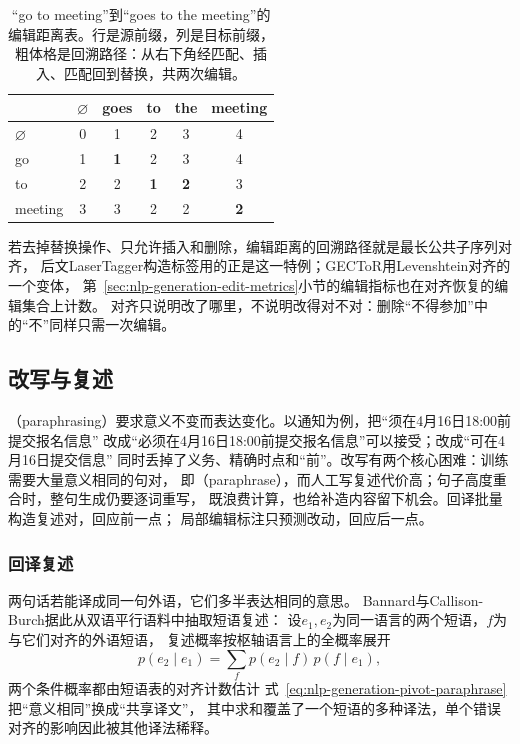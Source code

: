 \begin{table}[htbp]
  \centering
  \small
  \begin{tabular}{@{}lccccc@{}}
    \toprule
    & $\varnothing$ & goes & to & the & meeting\\
    \midrule
    $\varnothing$ & 0 & 1 & 2 & 3 & 4\\
    go & 1 & \textbf{1} & 2 & 3 & 4\\
    to & 2 & 2 & \textbf{1} & \textbf{2} & 3\\
    meeting & 3 & 3 & 2 & 2 & \textbf{2}\\
    \bottomrule
  \end{tabular}
  \caption{“go to meeting”到“goes to the meeting”的编辑距离表。行是源前缀，列是目标前缀，
  粗体格是回溯路径：从右下角经匹配、插入、匹配回到替换，共两次编辑。}
  \label{tab:nlp-generation-levenshtein}
\end{table}

若去掉替换操作、只允许插入和删除，编辑距离的回溯路径就是最长公共子序列对齐，
后文LaserTagger构造标签用的正是这一特例；GECToR用Levenshtein对齐的一个变体，
第~\ref{sec:nlp-generation-edit-metrics}小节的编辑指标也在对齐恢复的编辑集合上计数。
对齐只说明改了哪里，不说明改得对不对：删除“不得参加”中的“不”同样只需一次编辑。

\subsection{改写与复述}
\label{sec:nlp-generation-paraphrase}

（paraphrasing）要求意义不变而表达变化。以通知为例，把“须在4月16日18:00前提交报名信息”
改成“必须在4月16日18:00前提交报名信息”可以接受；改成“可在4月16日提交信息”
同时丢掉了义务、精确时点和“前”。改写有两个核心困难：训练需要大量意义相同的句对，
即（paraphrase），而人工写复述代价高；句子高度重合时，整句生成仍要逐词重写，
既浪费计算，也给补造内容留下机会。回译批量构造复述对，回应前一点；
局部编辑标注只预测改动，回应后一点。

\subsubsection{回译复述}
\label{sec:nlp-generation-backtranslation-paraphrase}

两句话若能译成同一句外语，它们多半表达相同的意思。
Bannard与Callison-Burch据此从双语平行语料中抽取短语复述：
设$e_1,e_2$为同一语言的两个短语，$f$为与它们对齐的外语短语，
复述概率按枢轴语言上的全概率展开
\begin{equation}
  p(e_2\mid e_1)=\sum_{f}p(e_2\mid f)\,p(f\mid e_1),
  \label{eq:nlp-generation-pivot-paraphrase}
\end{equation}
两个条件概率都由短语表的对齐计数估计
式~\eqref{eq:nlp-generation-pivot-paraphrase}把“意义相同”换成“共享译文”，
其中求和覆盖了一个短语的多种译法，单个错误对齐的影响因此被其他译法稀释。


